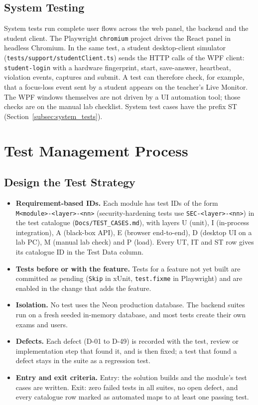 \subsection{System Testing}
\begin{sloppypar}
System tests run complete user flows across the web panel, the backend and the student client. The Playwright \texttt{chromium} project drives the React panel in headless Chromium. In the same test, a student desktop-client simulator (\texttt{tests/\allowbreak{}support/\allowbreak{}studentClient.ts}) sends the HTTP calls of the WPF client: \texttt{student-\allowbreak{}login} with a hardware fingerprint, start, save-answer, heartbeat, violation events, captures and submit. A test can therefore check, for example, that a focus-loss event sent by a student appears on the teacher's Live Monitor. The WPF windows themselves are not driven by a UI automation tool; those checks are on the manual lab checklist. System test cases have the prefix ST (Section~\ref{subsec:system_tests}).
\end{sloppypar}

\section{Test Management Process}
\label{sec:test_management}

\subsection{Design the Test Strategy}
\begin{itemize}[nosep]
  \item \textbf{Requirement-based IDs.} Each module has test IDs of the form \texttt{M<module>-\allowbreak{}<layer>-\allowbreak{}<nn>} (security-hardening tests use \texttt{SEC-\allowbreak{}<layer>-\allowbreak{}<nn>}) in the test catalogue (\texttt{Docs/\allowbreak{}TEST\_CASES.md}), with layers U (unit), I (in-process integration), A (black-box API), E (browser end-to-end), D (desktop UI on a lab PC), M (manual lab check) and P (load). Every UT, IT and ST row gives its catalogue ID in the Test Data column.
  \item \textbf{Tests before or with the feature.} Tests for a feature not yet built are committed as pending (\texttt{Skip} in xUnit, \texttt{test.fixme} in Playwright) and are enabled in the change that adds the feature.
  \item \textbf{Isolation.} No test uses the Neon production database. The backend suites run on a fresh seeded in-memory database, and most tests create their own exams and users.
  \item \textbf{Defects.} Each defect (D-01 to D-49) is recorded with the test, review or implementation step that found it, and is then fixed; a test that found a defect stays in the suite as a regression test.
  \item \textbf{Entry and exit criteria.} Entry: the solution builds and the module's test cases are written. Exit: zero failed tests in all suites, no open defect, and every catalogue row marked as automated maps to at least one passing test.
\end{itemize}

